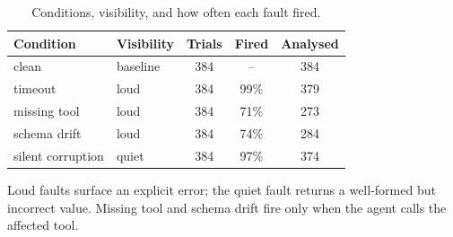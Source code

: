 \begin{table}[!t]
\centering
\caption{Conditions, visibility, and how often each fault fired.}
\label{tab:faults}
\footnotesize
\setlength{\tabcolsep}{4pt}
\begin{tabular}{llccc}
\hline
Condition & Visibility & Trials & Fired & Analysed \\
\hline
clean & baseline & 384 & -- & 384 \\
timeout & loud & 384 & 99\% & 379 \\
missing tool & loud & 384 & 71\% & 273 \\
schema drift & loud & 384 & 74\% & 284 \\
silent corruption & quiet & 384 & 97\% & 374 \\
\hline
\end{tabular}
\par\smallskip\scriptsize Loud faults surface an explicit error; the quiet fault returns a well-formed but incorrect value. Missing tool and schema drift fire only when the agent calls the affected tool.
\end{table}

